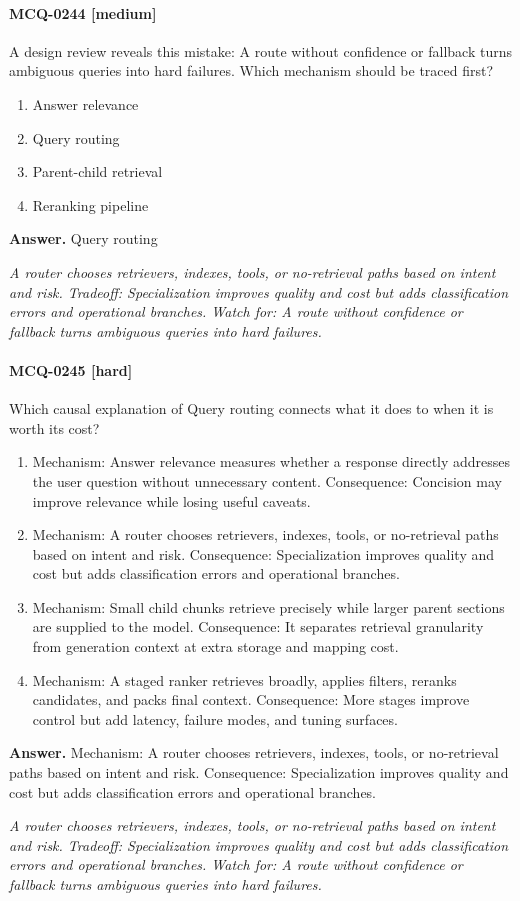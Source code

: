 \paragraph{MCQ-0244 [medium]} A design review reveals this mistake: A route without confidence or fallback turns ambiguous queries into hard failures. Which mechanism should be traced first?
\begin{enumerate}[label=\Alph*.]
\item Answer relevance
\item Query routing
\item Parent-child retrieval
\item Reranking pipeline
\end{enumerate}
\noindent\textbf{Answer.} Query routing
\par\textit{A router chooses retrievers, indexes, tools, or no-retrieval paths based on intent and risk. Tradeoff: Specialization improves quality and cost but adds classification errors and operational branches. Watch for: A route without confidence or fallback turns ambiguous queries into hard failures.}
\paragraph{MCQ-0245 [hard]} Which causal explanation of Query routing connects what it does to when it is worth its cost?
\begin{enumerate}[label=\Alph*.]
\item Mechanism: Answer relevance measures whether a response directly addresses the user question without unnecessary content. Consequence: Concision may improve relevance while losing useful caveats.
\item Mechanism: A router chooses retrievers, indexes, tools, or no-retrieval paths based on intent and risk. Consequence: Specialization improves quality and cost but adds classification errors and operational branches.
\item Mechanism: Small child chunks retrieve precisely while larger parent sections are supplied to the model. Consequence: It separates retrieval granularity from generation context at extra storage and mapping cost.
\item Mechanism: A staged ranker retrieves broadly, applies filters, reranks candidates, and packs final context. Consequence: More stages improve control but add latency, failure modes, and tuning surfaces.
\end{enumerate}
\noindent\textbf{Answer.} Mechanism: A router chooses retrievers, indexes, tools, or no-retrieval paths based on intent and risk. Consequence: Specialization improves quality and cost but adds classification errors and operational branches.
\par\textit{A router chooses retrievers, indexes, tools, or no-retrieval paths based on intent and risk. Tradeoff: Specialization improves quality and cost but adds classification errors and operational branches. Watch for: A route without confidence or fallback turns ambiguous queries into hard failures.}
